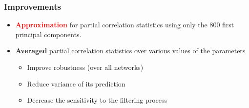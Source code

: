 \documentclass[final]{beamer}
\newcommand{\cmark}{\ding{51}}%
\begin{document}

\begin{frame}
\frametitle{Improvements}

\begin{itemize}
\item \textcolor{red}{\textbf{Approximation}} for partial correlation statistics using only the \textcolor{i6blue}{800 first principal components}. \\[5ex]
\item {\color{red} \textbf{Averaged} partial correlation statistics} over various values of the parameters
	\begin{itemize}
		\item[{\color{green} \cmark}] Improve robustness (over all networks)
		\item[{\color{green} \cmark}] Reduce variance of its prediction
		\item[{\color{green} \cmark}] Decrease the sensitivity to the filtering process
	\end{itemize}
\end{itemize}

\end{frame}

\end{document}
